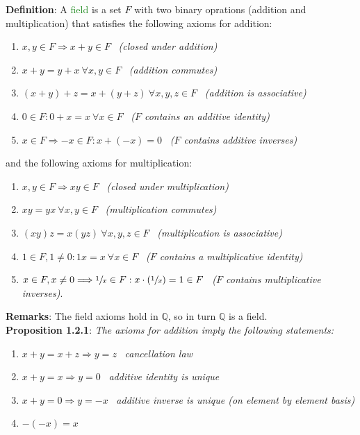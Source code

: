 \documentclass{article}
\begin{document}
\textbf{Definition}: A \textcolor{ForestGreen}{field} is a set $F$ with two binary oprations (addition and multiplication) that satisfies the following axioms for addition:

\begin{enumerate}
    \item $x,y \in F \Longrightarrow x+y \in F$ \ \textit{(closed under addition)}
    \item $x+y=y+x \ \forall x,y \in F$ \ \textit{(addition commutes)}
    \item $(x + y) + z = x + (y + z) \ \forall x,y,z \in F$ \ \textit{(addition is associative)}
    \item $0 \in F:0+x=x \ \forall x \in F$ \ \textit{($F$ contains an additive identity)}
    \item $x \in F \Longrightarrow -x \in F:x+(-x)=0$ \ \textit{($F$ contains additive inverses)}
\end{enumerate}

and the following axioms for multiplication:

\begin{enumerate}
    \item $x,y \in F \Longrightarrow xy \in F$ \ \textit{(closed under multiplication)}
    \item $xy=yx \ \forall x,y \in F$ \ \textit{(multiplication commutes)}
    \item $(xy)z=x(yz) \ \forall x,y,z \in F$ \ \textit{(multiplication is associative)}
    \item $1 \in F, 1 \neq 0:1x=x \ \forall x \in F$ \ \textit{($F$ contains a multiplicative identity)}
    \item $x \in F , x \neq 0\Longrightarrow \sfrac{1}{x} \in F: x \cdot (\sfrac{1}{x})=1 \in F$ \ \textit{($F$ contains multiplicative inverses)}.
\end{enumerate}

\textbf{Remarks}: The field axioms hold in $\mathbb{Q}$, so in turn $\mathbb{Q}$ is a field.\\

\textbf{Proposition 1.2.1}: \textit{The axioms for addition imply the following statements:}
\begin{enumerate}
    \item $x+y=x+z \Longrightarrow y = z$ \ \textit{cancellation law}
    \item $x+y=x \Longrightarrow y = 0$ \ \textit{additive identity is unique}
    \item $x+y=0 \Longrightarrow y = -x$ \ \textit{additive inverse is unique (on element by element basis)}
    \item $-(-x)=x$
\end{enumerate}
\end{document}
